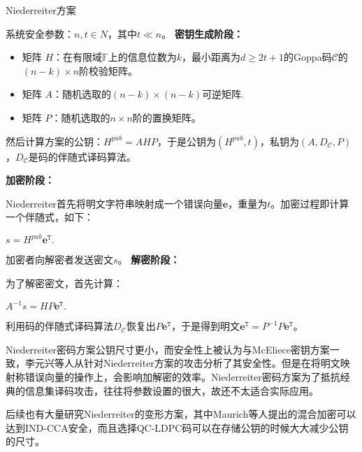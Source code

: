 \begin{breakablealgorithm}
	\small
	\renewcommand{\algorithmicrequire}{\textbf{Input:}}
	\renewcommand{\algorithmicensure}{\textbf{Output:}}
	\caption{Niederreiter方案}
	\label{alg:Niederreiter}
	\begin{algorithmic}
		\State
		系统安全参数：$n,t \in N$，其中$t \ll n$。
		\State
		\textbf{密钥生成阶段：}
		
		\begin{itemize}
			\item 矩阵 $H$：在有限域$\mathbb{F}$上的信息位数为$k$，最小距离为$d \geq 2t + 1$的Goppa码$\mathcal{C}$的$(n-k) \times n$阶校验矩阵。
			\item 矩阵 $A$：随机选取的$(n-k) \times (n-k)$可逆矩阵.
			\item 矩阵 $P$：随机选取的$n \times n$阶的置换矩阵。			
		\end{itemize}
	
		然后计算方案的公钥：$H^{pub} = AHP$，于是公钥为$(H^{pub}, t)$，私钥为$(A,D_\mathcal{C},P)$，$D_\mathcal{C}$是码的伴随式译码算法。
		
		\State
		\textbf{加密阶段：}
		
		Niederreiter首先将明文字符串映射成一个错误向量$\mathbf{e}$，重量为$t$。加密过程即计算一个伴随式，如下：
		
		\begin{center}
			$s = H^{pub}\mathbf{e}^\mathtt{T}.$
		\end{center}
		
		加密者向解密者发送密文$s$。
		\State
		\textbf{解密阶段：}
		
		为了解密密文，首先计算：
		\begin{center}
			$A^{-1}s = HP\mathbf{e}^\mathtt{T}.$
		\end{center}
	    利用码的伴随式译码算法$D_\mathcal{C}$恢复出$P\mathbf{e}^\mathtt{T}$，于是得到明文$\mathbf{e}^\mathtt{T} = P^{-1}P\mathbf{e}^\mathtt{T}$。		
	\end{algorithmic}
\end{breakablealgorithm}

Niederreiter密码方案公钥尺寸更小，而安全性上被认为与McEliece密钥方案一致，李元兴等人从针对Niederreiter方案的攻击分析了其安全性\cite{李元兴1993关于}。但是在将明文映射称错误向量的操作上，会影响加解密的效率。Niederreiter密码方案为了抵抗经典的信息集译码攻击，往往将参数设置的很大，故还不太适合实际应用。

后续也有大量研究Niederreiter的变形方案，其中Maurich等人提出的混合加密\cite{Maurich2016IND}可以达到IND-CCA安全，而且选择QC-LDPC码可以在存储公钥的时候大大减少公钥的尺寸。
